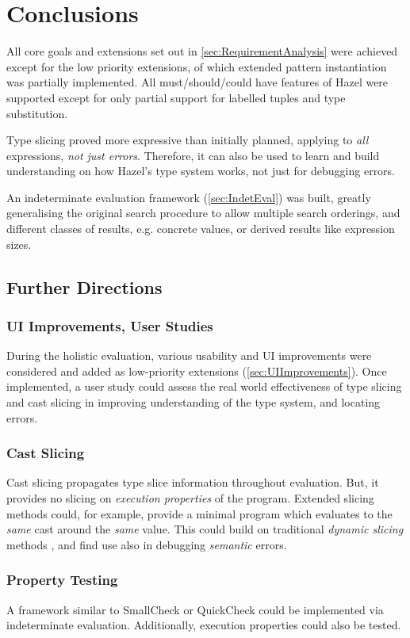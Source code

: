 \chapter{Conclusions}\label{chap:Conclusions}
All core goals and extensions set out in \cref{sec:RequirementAnalysis} were achieved except for the low priority extensions, of which extended pattern instantiation was partially implemented. All must/should/could have features of Hazel were supported except for only partial support for labelled tuples and type substitution.

Type slicing proved more expressive than initially planned, applying to \textit{all} expressions, \textit{not just errors}. Therefore, it can also be used to learn and build understanding on how Hazel's type system works, not just for debugging errors. 

An indeterminate evaluation framework (\cref{sec:IndetEval}) was built, greatly generalising the original search procedure \cite{SearchProc} to allow multiple search orderings, and different classes of results, e.g. concrete values, or derived results like expression sizes.
\section{Further Directions}
\subsection{UI Improvements, User Studies}
During the holistic evaluation, various usability and UI improvements were considered and added as low-priority extensions (\cref{sec:UIImprovements}). Once implemented, a user study could assess the real world effectiveness of type slicing and cast slicing in improving understanding of the type system, and locating errors.

\subsection{Cast Slicing}
Cast slicing propagates type slice information throughout evaluation. But, it provides no slicing on \textit{execution properties} of the program. Extended slicing methods could, for example, provide a minimal program which evaluates to the \textit{same} cast around the \textit{same} value. This could build on traditional \textit{dynamic slicing} methods \cite{DynProgSlice, FunctionalProgExplain}, and find use also in debugging \textit{semantic} errors.

\subsection{Property Testing}
A framework similar to SmallCheck \cite{SmallCheck} or QuickCheck \cite{QuickCheck} could be implemented via indeterminate evaluation. Additionally, execution properties could also be tested.

